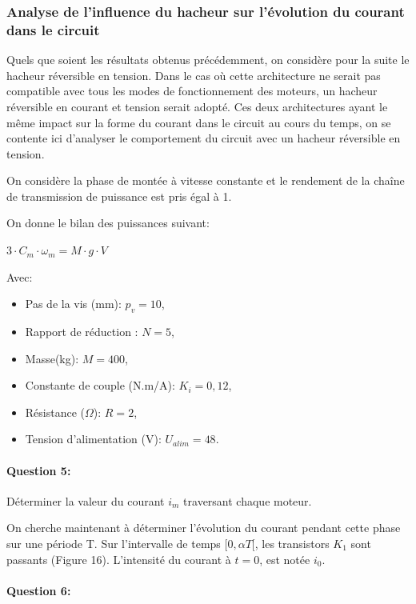 \subsubsection{Analyse de l'influence du hacheur sur l'évolution du courant dans le circuit}

Quels que soient les résultats obtenus précédemment, on considère pour la suite le hacheur réversible en
tension. Dans le cas où cette architecture ne serait pas compatible avec tous les modes de fonctionnement
des moteurs, un hacheur réversible en courant et tension serait adopté. Ces deux architectures ayant le même
impact sur la forme du courant dans le circuit au cours du temps, on se contente ici d'analyser le comportement
du circuit avec un hacheur réversible en tension.

On considère la phase de montée à vitesse constante et le rendement de la chaîne de transmission de
puissance est pris égal à 1.

On donne le bilan des puissances suivant:

$3\cdot C_m\cdot\omega_m=M\cdot g\cdot V$

Avec:
\begin{itemize}
 \item Pas de la vis (mm): $p_v=10$,
 \item Rapport de réduction : $N=5$,
 \item Masse(kg): $M=400$,
 \item Constante de couple (N.m/A): $K_i=0,12$,
 \item Résistance ($\Omega$): $R=2$,
 \item Tension d'alimentation (V): $U_{alim}=48$.
\end{itemize}

\paragraph{Question 5:}

Déterminer la valeur du courant $i_m$ traversant chaque moteur.

On cherche maintenant à déterminer l'évolution du courant pendant cette phase sur une période T. Sur l'intervalle de temps $[0,\alpha T[$, les transistors $K_1$ sont passants (Figure 16). L'intensité du courant à $t = 0$, est
notée $i_0$.

\paragraph{Question 6:}

